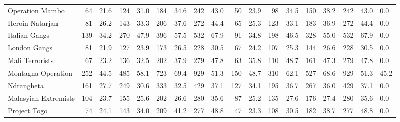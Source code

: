 \begin{tabular}{lrrrrrrrrrrrrrrrrl}
Operation Mambo      &                64 &  21.6 &  124 &  31.0 &  184 &  34.6 &  242 &  43.0 &               50 &   23.9 &   98 &   34.5 &  150 &   38.2 &  242 &  43.0 &        0.0 \\
Heroin Natarjan      &                81 &  26.2 &  143 &  33.3 &  206 &  37.6 &  272 &  44.4 &               65 &   25.3 &  123 &   33.1 &  183 &   36.9 &  272 &  44.4 &        0.0 \\
Italian Gangs        &               139 &  34.2 &  270 &  47.9 &  396 &  57.5 &  532 &  67.9 &               91 &   34.8 &  198 &   46.5 &  328 &   55.0 &  532 &  67.9 &        0.0 \\
London Gangs         &                81 &  21.9 &  127 &  23.9 &  173 &  26.5 &  228 &  30.5 &               67 &   24.2 &  107 &   25.3 &  144 &   26.6 &  228 &  30.5 &        0.0 \\
Mali Terrorists      &                67 &  23.2 &  136 &  32.5 &  202 &  37.9 &  279 &  47.8 &               63 &   35.8 &  110 &   48.7 &  161 &   47.3 &  279 &  47.8 &        0.0 \\
Montagna Operation   &               252 &  44.5 &  485 &  58.1 &  723 &  69.4 &  929 &  51.3 &              150 &   48.7 &  310 &   62.1 &  527 &   68.6 &  929 &  51.3 &       45.2 \\
Ndrangheta           &               161 &  27.7 &  249 &  30.6 &  333 &  32.5 &  429 &  37.1 &              127 &   34.1 &  195 &   36.7 &  267 &   36.0 &  429 &  37.1 &        0.0 \\
Malasyian Extremists &               104 &  23.7 &  155 &  25.6 &  202 &  26.6 &  280 &  35.6 &               87 &   25.2 &  135 &   27.6 &  176 &   27.4 &  280 &  35.6 &        0.0 \\
Project Togo         &                74 &  24.1 &  143 &  34.0 &  209 &  41.2 &  277 &  48.8 &               47 &   23.3 &  108 &   30.5 &  182 &   38.7 &  277 &  48.8 &        0.0 \\
\bottomrule
\end{tabular}
